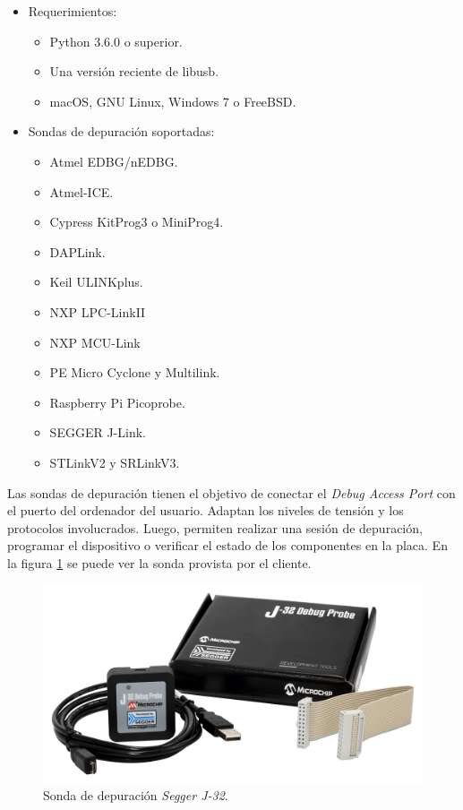 \begin{itemize}
    \item Requerimientos:
        \begin{itemize}
            \item Python 3.6.0 o superior.
            \item Una versión reciente de libusb.
            \item macOS, GNU Linux, Windows 7 o FreeBSD.
        \end{itemize}
    \item Sondas de depuración soportadas:
        \begin{itemize}
            \item Atmel EDBG/nEDBG.
            \item Atmel-ICE.
            \item Cypress KitProg3 o MiniProg4.
            \item DAPLink.
            \item Keil ULINKplus.
            \item NXP LPC-LinkII
            \item NXP MCU-Link
            \item PE Micro Cyclone y Multilink.
            \item Raspberry Pi Picoprobe.
            \item SEGGER J-Link.
            \item STLinkV2 y SRLinkV3.
        \end{itemize}
\end{itemize}




Las sondas de depuración tienen el objetivo de conectar el \emph{Debug Access Port} con el puerto del ordenador del usuario.
Adaptan los niveles de tensión y los protocolos involucrados.
Luego, permiten realizar una sesión de depuración, programar el dispositivo o verificar el estado de los componentes en la placa.
En la figura \ref{fig:sonda} se puede ver la sonda provista por el cliente.

\begin{figure}[htbp]
	\centering
	\includegraphics[width=.8\textwidth]{./Figures/segger.jpg}
    \caption{Sonda de depuración \emph{Segger J-32}\protect\footnotemark.}
	\label{fig:sonda}
\end{figure}

